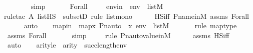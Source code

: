\begin{isabellebody}
\ \ \ \ \ \ \isamarkupfalse%
\ simp\isanewline
\ \ \isamarkupfalse%
\isanewline
{}\isamarkupfalse%
\isanewline
\ \ \isamarkupfalse%
\ {\isacharparenleft}{\kern0pt}Forall\ {\isasymphi}{\isacharparenright}{\kern0pt}\isanewline
\isanewline
\ \ \isamarkupfalse%
\ envin\ {\isacharcolon}{\kern0pt}\ {\isachardoublequoteopen}env\ {\isasymin}\ list{\isacharparenleft}{\kern0pt}M{\isacharparenright}{\kern0pt}{\isachardoublequoteclose}\ \isanewline
\ \ \ \ \isamarkupfalse%
{\isacharparenleft}{\kern0pt}rule{\isacharunderscore}{\kern0pt}tac\ A{\isacharequal}{\kern0pt}\ {\isachardoublequoteopen}list{\isacharparenleft}{\kern0pt}HS{\isacharparenright}{\kern0pt}{\isachardoublequoteclose}\ \ subsetD{\isacharcomma}{\kern0pt}\ rule\ list{\isacharunderscore}{\kern0pt}mono{\isacharparenright}{\kern0pt}\isanewline
\ \ \ \ \isamarkupfalse%
\ HS{\isacharunderscore}{\kern0pt}iff\ P{\isacharunderscore}{\kern0pt}name{\isacharunderscore}{\kern0pt}in{\isacharunderscore}{\kern0pt}M\ assms\ Forall\isanewline
\ \ \ \ \isamarkupfalse%
\ auto\isanewline
\ \ \isamarkupfalse%
\ mapin\ {\isacharcolon}{\kern0pt}\ {\isachardoublequoteopen}map{\isacharparenleft}{\kern0pt}{\isasymlambda}x{\isachardot}{\kern0pt}\ Pn{\isacharunderscore}{\kern0pt}auto{\isacharparenleft}{\kern0pt}{\isasympi}{\isacharparenright}{\kern0pt}\ {\isacharbackquote}{\kern0pt}\ x{\isacharcomma}{\kern0pt}\ env{\isacharparenright}{\kern0pt}\ {\isasymin}\ list{\isacharparenleft}{\kern0pt}M{\isacharparenright}{\kern0pt}{\isachardoublequoteclose}\ \ \isanewline
\ \ \ \ \isamarkupfalse%
{\isacharparenleft}{\kern0pt}rule\ map{\isacharunderscore}{\kern0pt}type{\isacharparenright}{\kern0pt}\isanewline
\ \ \ \ \isamarkupfalse%
\ assms\ Forall\isanewline
\ \ \ \ \ \isamarkupfalse%
\ simp\isanewline
\ \ \ \ \isamarkupfalse%
{\isacharparenleft}{\kern0pt}rule\ Pn{\isacharunderscore}{\kern0pt}auto{\isacharunderscore}{\kern0pt}value{\isacharunderscore}{\kern0pt}in{\isacharunderscore}{\kern0pt}M{\isacharparenright}{\kern0pt}\isanewline
\ \ \ \ \isamarkupfalse%
\ assms\ HS{\isacharunderscore}{\kern0pt}iff\isanewline
\ \ \ \ \isamarkupfalse%
\ auto\isanewline
\isanewline
\ \ \isamarkupfalse%
\ arityle\ {\isacharcolon}{\kern0pt}\ {\isachardoublequoteopen}arity{\isacharparenleft}{\kern0pt}{\isasymphi}{\isacharparenright}{\kern0pt}\ {\isasymle}\ succ{\isacharparenleft}{\kern0pt}length{\isacharparenleft}{\kern0pt}env{\isacharparenright}{\kern0pt}{\isacharparenright}{\kern0pt}{\isachardoublequoteclose}\isanewline

\end{isabellebody}
